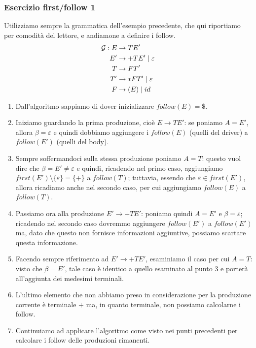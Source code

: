 \documentclass[class=book, crop=false, oneside, 12pt]{standalone}
\begin{document}
\subsubsection{Esercizio first/follow 1}
\label{first-follow-ex-1}
Utilizziamo sempre la grammatica dell'esempio precedente, che qui riportiamo per comodità del lettore, e andiamone a definire i follow.
\begin{align*}
    \mathcal{G}: E &\rightarrow TE' \\
    E' &\rightarrow +TE' \mid \varepsilon \\
    T &\rightarrow FT' \\
    T' &\rightarrow *FT' \mid \varepsilon\\
    F &\rightarrow (E) \mid id
\end{align*}
\begin{enumerate}
    \item Dall'algoritmo sappiamo di dover inizializzare \(follow(E) = \$\).
    \item Iniziamo guardando la prima produzione, cioè \(E \rightarrow TE'\): se poniamo \(A = E'\), allora \(\beta = \varepsilon\) e quindi dobbiamo aggiungere i \(follow(E)\) (quelli del driver) a \(follow(E')\) (quelli del body).
    \item Sempre soffermandoci sulla stessa produzione poniamo \(A = T\): questo vuol dire che \(\beta = E' \neq \varepsilon\) e quindi, ricadendo nel primo caso, aggiungiamo \(first(E') \setminus \{\varepsilon\} = \{+\}\) a \(follow(T)\); tuttavia, essendo che \(\varepsilon \in first(E')\), allora ricadiamo anche nel secondo caso, per cui aggiungiamo \(follow(E)\) a \(follow(T)\).
    \item Passiamo ora alla produzione \(E' \rightarrow +TE'\): poniamo quindi \(A = E'\) e \(\beta = \varepsilon\); ricadendo nel secondo caso dovremmo aggiungere \(follow(E')\) a \(follow(E')\) ma, dato che questo non fornisce informazioni aggiuntive, possiamo scartare questa informazione.
    \item Facendo sempre riferimento ad \(E' \rightarrow +TE'\), esaminiamo il caso per cui \(A = T\): visto che \(\beta = E'\), tale caso è identico a quello esaminato al punto 3 e porterà all'aggiunta dei medesimi terminali.
    \item L'ultimo elemento che non abbiamo preso in considerazione per la produzione corrente è terminale \(+\) ma, in quanto terminale, non possiamo calcolarne i follow.
    \item Continuiamo ad applicare l'algoritmo come visto nei punti precedenti per calcolare i follow delle produzioni rimanenti.
\end{enumerate}
\end{document}
